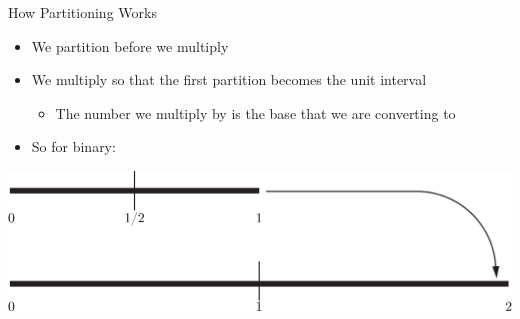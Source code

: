 \documentclass{beamer}
\begin{document}
          \begin{frame}{How Partitioning Works}
            \begin{itemize}
              \item We partition before we multiply
              \item We multiply so that the first partition becomes the unit interval
              \begin{itemize}
                \item The number we multiply by is the base that we are converting to
              \end{itemize}
              \item So for binary:
            \end{itemize}
            \includegraphics[width=\textwidth]{images/partitioning/partitioning}
          \end{frame}















\end{document}
